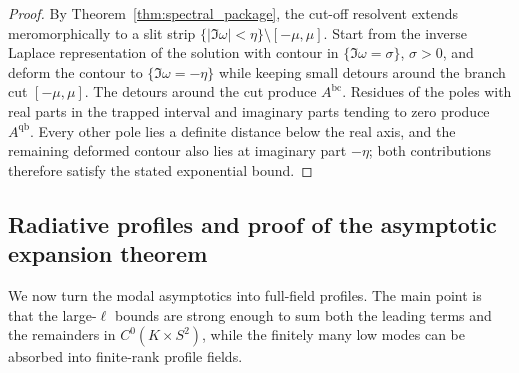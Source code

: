 \documentclass[12pt]{article}
\numberwithin{equation}{section}
\theoremstyle{plain}
\theoremstyle{definition}
\theoremstyle{remark}
\newcommand{\bc}{\mathrm{bc}}
\newcommand{\qb}{\mathrm{qb}}
\newcommand{\abs}[1]{\left|#1\right|}
\begin{document}
\begin{proof}
By Theorem~\ref{thm:spectral_package}, the cut-off resolvent extends meromorphically to a slit strip $\{\abs{\Im\omega}<\eta\}\setminus[-\mu,\mu]$.  Start from the inverse Laplace representation of the solution with contour in $\{\Im\omega=\sigma\}$, $\sigma>0$, and deform the contour to $\{\Im\omega=-\eta\}$ while keeping small detours around the branch cut $[-\mu,\mu]$.  The detours around the cut produce $A^{\bc}$.  Residues of the poles with real parts in the trapped interval and imaginary parts tending to zero produce $A^{\qb}$.  Every other pole lies a definite distance below the real axis, and the remaining deformed contour also lies at imaginary part $-\eta$; both contributions therefore satisfy the stated exponential bound.
\end{proof}


\subsection{Radiative profiles and proof of the asymptotic expansion theorem}

We now turn the modal asymptotics into full-field profiles.  The main point is that the large-$\ell$ bounds are strong enough to sum both the leading terms and the remainders in $C^0(K\times S^2)$, while the finitely many low modes can be absorbed into finite-rank profile fields.
\end{document}
